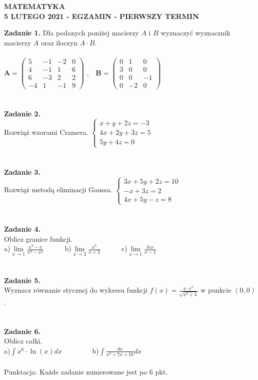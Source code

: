 \documentclass[12pt,a4paper]{report}
\begin{document}
\begin{center}

\textbf{MATEMATYKA \\5 LUTEGO 2021 - EGZAMIN - PIERWSZY TERMIN}

\end{center}\textbf{Zadanie 1.}  Dla podanych poniżej macierzy $A$ i $B$ wyznaczyć wyznacznik macierzy $A$ oraz iloczyn $A\cdot B$. \\\\ $ \mathbf{A} =\left( \begin{array}{cccc}5 & -1& -2 & 0\\4 & -1&1 & 6\\6 & -3& 2 & 2\\-4 & 1 & -1 & 9 \end{array} \right)$ ,\ \ $\mathbf{B} =\left( \begin{array}{ccc}0 & 1& 0\\3 & 0& 0\\0 & 0& -1\\0 & -2& 0\end{array} \right)$\\\\\\\textbf{Zadanie 2.} \\Rozwiąż wzorami Cramera. $\left\{ \begin{array}{ll}x+y+2z=-3\\4x+2y+3z=5\\5y+4z=0\end{array} \right.$\\\\\\\textbf{Zadanie 3.} \\Rozwiąż metodą eliminacji Gaussa. $\left\{ \begin{array}{ll}3x+5y+2z=10\\-x+3z=2\\4x+5y-z=8\end{array} \right.$\\\\\\\textbf{Zadanie 4.}\\Oblicz granice funkcji.\\a)$\lim\limits_{x\to 1}\frac{x^3-x}{x^3-x^2}$\ \ \ \ \ \  b)$\lim\limits_{x\to 2}\frac{x^3}{x+2}$\ \ \ \ \ \ c)$\lim\limits_{x\to 1} \frac{lnx}{x-1}$\\\\\\\textbf{Zadanie 5.} \\Wyznacz równanie stycznej do wykresu funkcji $f(x)=\frac{x\cdot e^x}{\sqrt{x^2+4}}$ w punkcie $(0,0)$.\\\\\\\textbf{Zadanie 6.}\\Oblicz całki. \\a)$\int x^6\cdot \ln(x) dx$ \ \ \ \ \ \ \ \ b)$\int \frac{dx}{x^2+7x+10} dx$\\\\Punktacja: Każde zadanie numerowane jest po 6 pkt.
\end{document}
